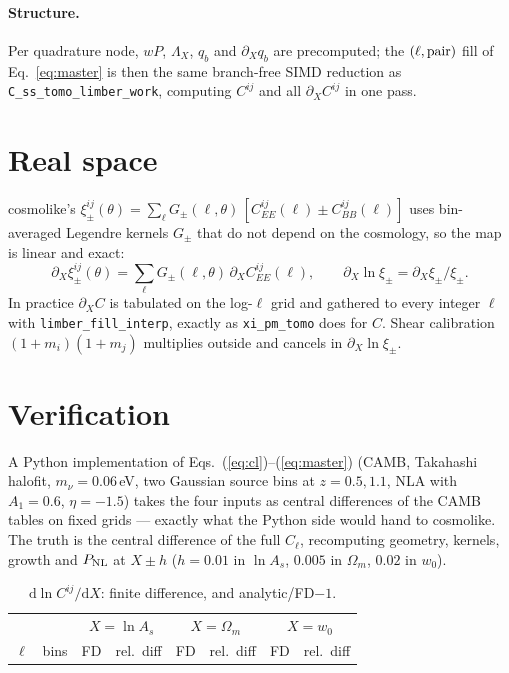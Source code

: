 \documentclass[11pt]{article}
\newcommand{\dd}{\mathrm{d}}
\newcommand{\pX}{\partial_X}
\begin{document}
\paragraph{Structure.} Per quadrature node, $w P$, $\Lambda_X$, $q_b$ and
$\pX q_b$ are precomputed; the $(\ell,{\rm pair})$ fill of
Eq.~\eqref{eq:master} is then the same branch-free SIMD reduction as
\texttt{C\_ss\_tomo\_limber\_work}, computing $C^{ij}$ and all $\pX C^{ij}$ in
one pass.

\section{Real space}
cosmolike's $\xi_\pm^{ij}(\theta)=\sum_\ell G_\pm(\ell,\theta)\,
[C^{ij}_{EE}(\ell)\pm C^{ij}_{BB}(\ell)]$ uses bin-averaged Legendre kernels
$G_\pm$ that do not depend on the cosmology, so the map is linear and exact:
\begin{equation}
\pX\xi_\pm^{ij}(\theta)=\sum_\ell G_\pm(\ell,\theta)\,\pX C^{ij}_{EE}(\ell),
\qquad
\pX\ln\xi_\pm=\pX\xi_\pm/\xi_\pm .
\end{equation}
In practice $\pX C$ is tabulated on the log-$\ell$ grid and gathered to every
integer $\ell$ with \texttt{limber\_fill\_interp}, exactly as \texttt{xi\_pm\_tomo}
does for $C$. Shear calibration $(1+m_i)(1+m_j)$ multiplies outside and
cancels in $\pX\ln\xi_\pm$.

\section{Verification}
A Python implementation of Eqs.~(\ref{eq:cl})--(\ref{eq:master}) (CAMB,
Takahashi halofit, $m_\nu=0.06$\,eV, two Gaussian source bins at $z=0.5,1.1$,
NLA with $A_1=0.6$, $\eta=-1.5$) takes the four inputs as central
differences of the CAMB tables on fixed grids --- exactly what the Python side
would hand to cosmolike. The truth is the central difference of the full
$C_\ell$, recomputing geometry, kernels, growth and $P_{\rm NL}$ at $X\pm h$
($h=0.01$ in $\ln A_s$, $0.005$ in $\Omega_m$, $0.02$ in $w_0$).

\begin{table}[h]
\centering\small
\caption{$\dd\ln C^{ij}/\dd X$: finite difference, and analytic/FD$-1$.}
\label{tab:exact}
\begin{tabular}{rc|rr|rr|rr}
\toprule
& & \multicolumn{2}{c|}{$X=\ln A_s$} & \multicolumn{2}{c|}{$X=\Omega_m$}
& \multicolumn{2}{c}{$X=w_0$}\\
$\ell$ & bins & FD & rel.\ diff & FD & rel.\ diff & FD & rel.\ diff\\
\midrule

\bottomrule
\end{tabular}
\end{table}
\end{document}
